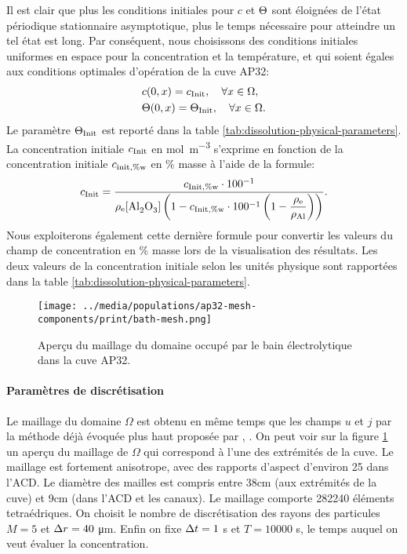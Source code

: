 Il est clair que plus les conditions initiales pour $c$ et
$\Theta$ sont éloignées de l'état périodique stationnaire
asymptotique, plus le temps nécessaire pour atteindre un tel état est
long. Par conséquent, nous choisissons des conditions initiales
uniformes en espace pour la concentration et la température, et qui
soient égales aux conditions optimales d'opération de la cuve AP32:
\begin{align*}
  & c(0, x) = c_\text{Init},\quad\forall x\in\Omega,\\
  & \Theta(0, x) = \Theta_\text{Init},\quad\forall x\in\Omega.
\end{align*}
Le paramètre $\Theta_\text{Init}$ est reporté dans la table
\ref{tab:dissolution-physical-parameters}. La concentration initiale
$c_\text{Init}$ en \si{\mol\per\cubic\meter} s'exprime en fonction de la
concentration initiale $c_{\text{init},\%\mathrm w}$ en \% masse à
l'aide de la formule:
\begin{equation*}
  \cinit = \frac{\cinitwp \cdot
    100^{-1}}{\electrolytedensity[\cee{Al2O3}]\parent{1 - \cinitwp\cdot
      100^{-1}\parent{1 - \displaystyle\frac{\electrolytedensity}{\aluminadensity}}}}.
\end{equation*}
Nous exploiterons également cette dernière formule pour convertir les
valeurs du champ de concentration en \% masse lors de la visualisation
des résultats. Les deux valeurs de la concentration initiale selon les
unités physique sont rapportées dans la table
\ref{tab:dissolution-physical-parameters}.

\begin{figure}[t]
  \begin{center}
    \texttt{[image: ../media/populations/ap32-mesh-components/print/bath-mesh.png]}
    \caption{Aperçu du maillage du domaine occupé par le bain
      électrolytique dans la cuve AP32.}
    \label{fig:bath-mesh}
  \end{center}
\end{figure}

\paragraph{Paramètres de discrétisation}
Le maillage du domaine $\Omega$ est obtenu en même temps que les
champs $u$ et $j$ par la méthode déjà évoquée plus haut proposée par
\cite{Steiner2009}, \cite{Rochat2016}. On peut voir sur la figure
\ref{fig:bath-mesh} un aperçu du maillage de $\Omega$ qui correspond à
l'une des extrémités de la cuve. Le maillage est fortement anisotrope,
avec des rapports d'aspect d'environ \num{25} dans l'ACD. Le diamètre
des mailles est compris entre \num{38}\si{\centi\meter} (aux
extrémités de la cuve) et \num{9}\si{\centi\meter} (dans l'ACD et les
canaux). Le maillage comporte \num{282240} éléments tetraédriques. On
choisit le nombre de discrétisation des rayons des particules $M = 5$
et $\Delta r = \num{40}$ \si{\micro\meter}. Enfin on fixe $\Delta t = 1$
\si{\second} et $T = \num{10000}$ \si{\second}, le temps auquel on
veut évaluer la concentration.



